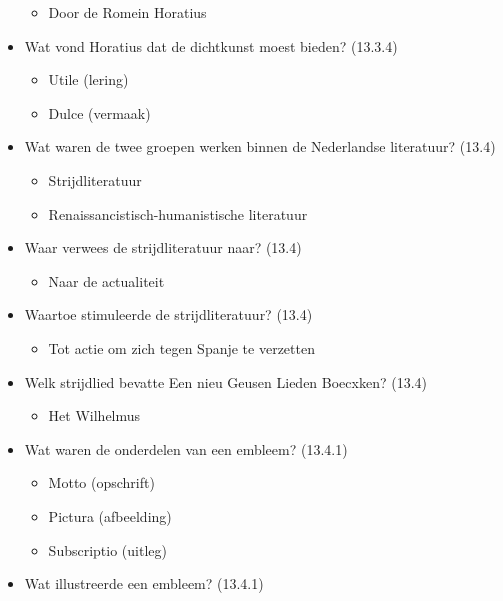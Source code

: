 \begin{itemize}
  \begin{itemize}
  \itemsep1pt\parskip0pt
  \item
    Door de Romein Horatius
  \end{itemize}
\item
  Wat vond Horatius dat de dichtkunst moest bieden? (13.3.4)

  \begin{itemize}
  \itemsep1pt\parskip0pt
  \item
    Utile (lering)
  \item
    Dulce (vermaak)
  \end{itemize}
\item
  Wat waren de twee groepen werken binnen de Nederlandse literatuur?
  (13.4)

  \begin{itemize}
  \itemsep1pt\parskip0pt
  \item
    Strijdliteratuur
  \item
    Renaissancistisch-humanistische literatuur
  \end{itemize}
\item
  Waar verwees de strijdliteratuur naar? (13.4)

  \begin{itemize}
  \itemsep1pt\parskip0pt
  \item
    Naar de actualiteit
  \end{itemize}
\item
  Waartoe stimuleerde de strijdliteratuur? (13.4)

  \begin{itemize}
  \itemsep1pt\parskip0pt
  \item
    Tot actie om zich tegen Spanje te verzetten
  \end{itemize}
\item
  Welk strijdlied bevatte Een nieu Geusen Lieden Boecxken? (13.4)

  \begin{itemize}
  \itemsep1pt\parskip0pt
  \item
    Het Wilhelmus
  \end{itemize}
\item
  Wat waren de onderdelen van een embleem? (13.4.1)

  \begin{itemize}
  \itemsep1pt\parskip0pt
  \item
    Motto (opschrift)
  \item
    Pictura (afbeelding)
  \item
    Subscriptio (uitleg)
  \end{itemize}
\item
  Wat illustreerde een embleem? (13.4.1)


\end{itemize}
